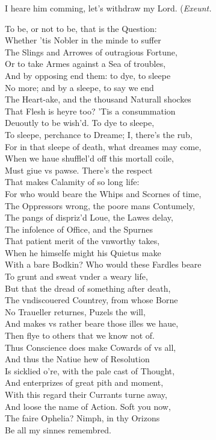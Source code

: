 \documentclass[a5paper,DIV=calc,11pt]{scrbook}
\begin{document}
\begin{drama*}
    \polspeaks I heare him comming, let's withdraw my Lord. \hfill(\textit{Exeunt.}
    
    
    \hamspeaks To be, or not to be, that is the Question:\\
    Whether 'tis Nobler in the minde to suffer\\
    The Slings and Arrowes of outragious Fortune,\\
    Or to take Armes against a Sea of troubles,\\
    And by opposing end them: to dye, to sleepe\\
    No more; and by a sleepe, to say we end\\
    The Heart-ake, and the thousand Naturall shockes\\
    That Flesh is heyre too? 'Tis a consummation\\
    Deuoutly to be wish'd. To dye to sleepe,\\
    To sleepe, perchance to Dreame; I, there's the rub,\\
    For in that sleepe of death, what dreames may come,\\
    When we haue shufflel'd off this mortall coile,\\
    Must giue vs pawse. There's the respect\\
    That makes Calamity of so long life:\\
    For who would beare the Whips and Scornes of time,\\
    The Oppressors wrong, the poore mans Contumely,\\
    The pangs of dispriz'd Loue, the Lawes delay,\\
    The infolence of Office, and the Spurnes\\
    That patient merit of the vnworthy takes,\\
    When he himselfe might his Quietus make\\
    With a bare Bodkin? Who would these Fardles beare\\
    To grunt and sweat vnder a weary life,\\
    But that the dread of something after death,\\
    The vndiscouered Countrey, from whose Borne\\
    No Traueller returnes, Puzels the will,\\
    And makes vs rather beare those illes we haue,\\
    Then flye to others that we know not of.\\
    Thus Conscience does make Cowards of vs all,\\
    And thus the Natiue hew of Resolution\\
    Is sicklied o're, with the pale cast of Thought,\\
    And enterprizes of great pith and moment,\\
    With this regard their Currants turne away,\\
    And loose the name of Action. Soft you now,\\
    The faire Ophelia? Nimph, in thy Orizons\\
    Be all my sinnes remembred.
    

\end{drama*}
\end{document}

